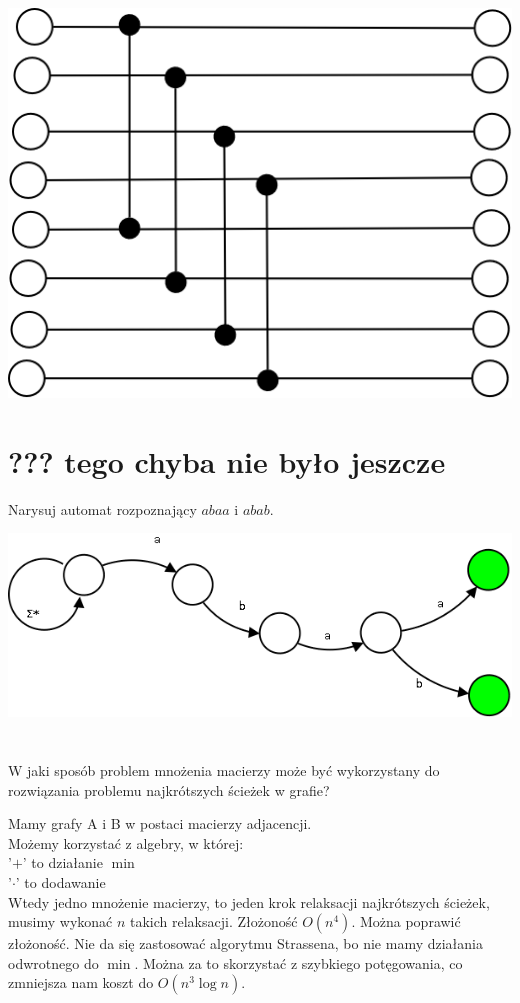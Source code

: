 \documentclass[svgnames]{report}
\begin{document}
\includegraphics[scale=0.55]{images/20.png}

\section{??? tego chyba nie było jeszcze}
\begin{framed}
Narysuj automat rozpoznający $abaa$ i $abab$.
\end{framed}

\includegraphics[scale=0.55]{images/22.png}

\section{}
\begin{framed}
W jaki sposób problem mnożenia macierzy może być wykorzystany do rozwiązania problemu najkrótszych ścieżek w grafie?
\end{framed}

Mamy grafy A i B w postaci macierzy adjacencji.\\
Możemy korzystać z algebry, w której:\\
'$+$' to działanie $\min$\\
'$\cdot$' to dodawanie\\
Wtedy jedno mnożenie macierzy, to jeden krok relaksacji najkrótszych ścieżek, musimy wykonać $n$ takich relaksacji. Złożoność $O(n^4)$. Można poprawić złożoność. Nie da się zastosować algorytmu Strassena, bo nie mamy działania odwrotnego do $\min$. Można za to skorzystać z szybkiego potęgowania, co zmniejsza nam koszt do $O(n^3\log n)$.
\end{document}
